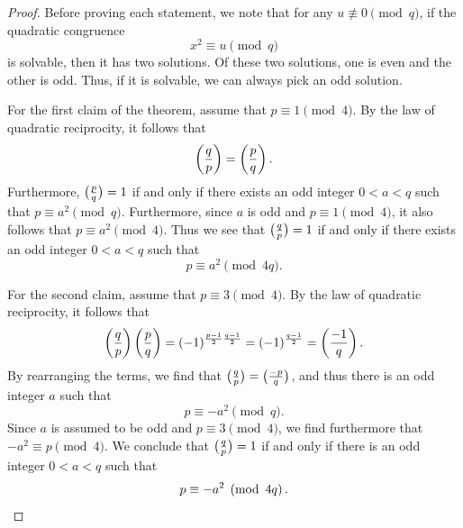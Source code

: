 \begin{proof}
  Before proving each statement, we note that for any $u\nequiv 0\pmod{q}$, if the quadratic congruence
  \begin{equation*}
    x^2\equiv u\pmod{q}
  \end{equation*}
  is solvable, then it has two solutions. Of these two solutions, one is even and the other is odd. Thus, if it is solvable, we can always pick an odd solution.
  
  For the first claim of the theorem, assume that $p\equiv 1\pmod{4}$. By the law of quadratic reciprocity, it follows that
  \begin{equation*}
    \legendre{q}{p}=\legendre{p}{q}. 
  \end{equation*}
  Furthermore, $\legendre{p}{q}=1$ if and only if there exists an odd integer $0<a<q$ such that $p\equiv a^2\pmod{q}$. Furthermore, since $a$ is odd and $p\equiv 1\pmod{4}$, it also follows that $p\equiv a^2\pmod{4}$. Thus we see that $\legendre{q}{p}=1$ if and only if there exists an odd integer $0<a<q$ such that
  \begin{equation*}
    p\equiv a^2\pmod{4q}.
  \end{equation*}
  
  For the second claim, assume that $p\equiv 3\pmod{4}$. By the law of quadratic reciprocity, it follows that
  \begin{equation*}
    \legendre{q}{p}\legendre{p}{q}=(-1)^{\frac{p-1}{2}\frac{q-1}{2}}=(-1)^{\frac{q-1}{2}}=\legendre{-1}{q}.
  \end{equation*}
  By rearranging the terms, we find that $\legendre{q}{p}=\legendre{-p}{q}$, and thus there is an odd integer $a$ such that
  \begin{equation*}
    p\equiv -a^2\pmod{q}.
  \end{equation*}
  Since $a$ is assumed to be odd and $p\equiv 3\pmod{4}$, we find furthermore that $-a^2\equiv p\pmod{4}$. We conclude that $\legendre{q}{p}=1$ if and only if there is an odd integer $0<a<q$ such that
  \begin{equation*}
    p\equiv -a^2\pmod{4q}.\qedhere
  \end{equation*}
\end{proof}

